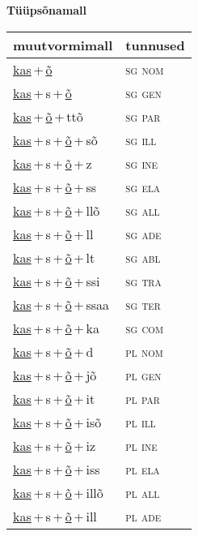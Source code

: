 
\vspace{1.8em}
\begin{minipage}{\textwidth}
\textbf{Tüüpsõnamall \,}\\

\begin{sideways}
\begin{tabular}{l l}
muutvormimall & tunnused \\
\hline
\underline{kas}\,+\,\underline{õ} & \textsc{ sg nom } \\
\underline{kas}\,+\,s\,+\,\underline{õ} & \textsc{ sg gen } \\
\underline{kas}\,+\,\underline{õ}\,+\,ttõ & \textsc{ sg par } \\
\underline{kas}\,+\,s\,+\,\underline{õ}\,+\,sõ & \textsc{ sg ill } \\
\underline{kas}\,+\,s\,+\,\underline{õ}\,+\,z & \textsc{ sg ine } \\
\underline{kas}\,+\,s\,+\,\underline{õ}\,+\,ss & \textsc{ sg ela } \\
\underline{kas}\,+\,s\,+\,\underline{õ}\,+\,llõ & \textsc{ sg all } \\
\underline{kas}\,+\,s\,+\,\underline{õ}\,+\,ll & \textsc{ sg ade } \\
\underline{kas}\,+\,s\,+\,\underline{õ}\,+\,lt & \textsc{ sg abl } \\
\underline{kas}\,+\,s\,+\,\underline{õ}\,+\,ssi & \textsc{ sg tra } \\
\underline{kas}\,+\,s\,+\,\underline{õ}\,+\,ssaa & \textsc{ sg ter } \\
\underline{kas}\,+\,s\,+\,\underline{õ}\,+\,ka & \textsc{ sg com } \\
\underline{kas}\,+\,s\,+\,\underline{õ}\,+\,d & \textsc{ pl nom } \\
\underline{kas}\,+\,s\,+\,\underline{õ}\,+\,jõ & \textsc{ pl gen } \\
\underline{kas}\,+\,s\,+\,\underline{õ}\,+\,it & \textsc{ pl par } \\
\underline{kas}\,+\,s\,+\,\underline{õ}\,+\,isõ & \textsc{ pl ill } \\
\underline{kas}\,+\,s\,+\,\underline{õ}\,+\,iz & \textsc{ pl ine } \\
\underline{kas}\,+\,s\,+\,\underline{õ}\,+\,iss & \textsc{ pl ela } \\
\underline{kas}\,+\,s\,+\,\underline{õ}\,+\,illõ & \textsc{ pl all } \\
\underline{kas}\,+\,s\,+\,\underline{õ}\,+\,ill & \textsc{ pl ade } \\

\end{tabular}
\end{sideways}
\end{minipage}
